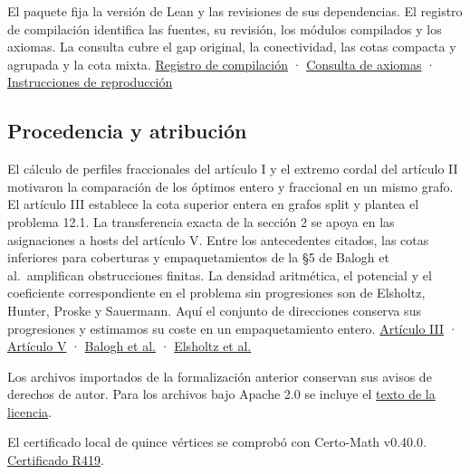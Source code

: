 \documentclass[spanish,11pt,a4paper]{article}
\begin{document}
El paquete fija la versión de Lean y las revisiones de sus dependencias. El registro de compilación identifica las fuentes, su revisión, los módulos compilados y los axiomas. La consulta cubre el gap original, la conectividad, las cotas compacta y agrupada y la cota mixta. \href{https://github.com/jtraverso/split-clique-partition-gap/blob/main/preprints/SPLITGAP/02_validation/v1.0/lean/status.json}{Registro de compilación} · \href{https://github.com/jtraverso/split-clique-partition-gap/blob/main/preprints/SPLITGAP/02_validation/v1.0/lean/checking-axioms.log}{Consulta de axiomas} · \href{https://github.com/jtraverso/split-clique-partition-gap/blob/main/preprints/SPLITGAP/03_reproducibility/README.md}{Instrucciones de reproducción}

\subsection{Procedencia y atribución}\label{procedencia-y-atribuciuxf3n}

El cálculo de perfiles fraccionales del artículo I y el extremo cordal del artículo II motivaron la comparación de los óptimos entero y fraccional en un mismo grafo. El artículo III establece la cota superior entera en grafos split y plantea el problema 12.1. La transferencia exacta de la sección 2 se apoya en las asignaciones a hosts del artículo V. Entre los antecedentes citados, las cotas inferiores para coberturas y empaquetamientos de la §5 de Balogh et al.~amplifican obstrucciones finitas. La densidad aritmética, el potencial y el coeficiente correspondiente en el problema sin progresiones son de Elsholtz, Hunter, Proske y Sauermann. Aquí el conjunto de direcciones conserva sus progresiones y estimamos su coste en un empaquetamiento entero. \href{https://github.com/jtraverso/erdos-81-chordal-clique-partitions/tree/3cbd90eed41af7e86ac6f1f4b8c796e20a5e661f/preprints/PAPER_III}{Artículo III} · \href{https://github.com/jtraverso/erdos-81-chordal-clique-partitions/tree/3cbd90eed41af7e86ac6f1f4b8c796e20a5e661f/preprints/PAPER_V}{Artículo V} · \href{https://arxiv.org/html/2412.05522v3}{Balogh et al.} · \href{https://arxiv.org/html/2406.12290v1}{Elsholtz et al.}

Los archivos importados de la formalización anterior conservan sus avisos de derechos de autor. Para los archivos bajo Apache 2.0 se incluye el \href{https://github.com/jtraverso/split-clique-partition-gap/blob/main/preprints/SPLITGAP/05_formalization/LICENSE-Apache-2.0.txt}{texto de la licencia}.

El certificado local de quince vértices se comprobó con Certo-Math v0.40.0. \href{https://github.com/jtraverso/certo-math/blob/0590da36a2af900b9f23d9d292aac62eb6b06ca9/research/R419/NOTE.md}{Certificado R419}.
\end{document}
